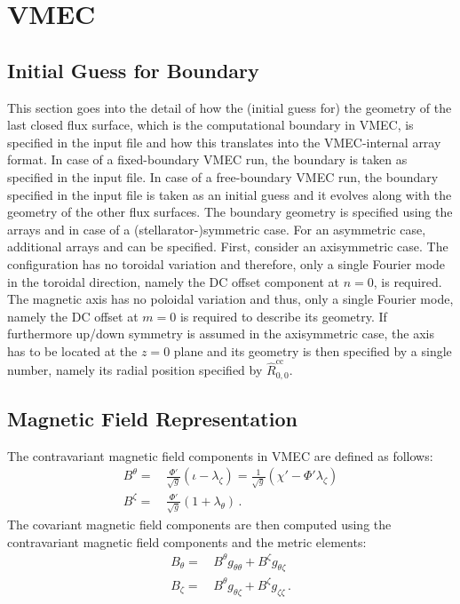 \chapter{VMEC}

\FloatBarrier
\section{Initial Guess for Boundary}
This section goes into the detail of how the (initial guess for) the geometry
of the last closed flux surface, which is the computational boundary in VMEC,
is specified in the input file and how this translates into the VMEC-internal array format.
In case of a fixed-boundary VMEC run, the boundary is taken as specified in the input file.
In case of a free-boundary VMEC run, the boundary specified in the input file
is taken as an initial guess and it evolves along with the geometry of the other flux surfaces.
The boundary geometry is specified using the arrays  and 
in case of a (stellarator-)symmetric case. For an asymmetric case,
additional arrays  and  can be specified.
First, consider an axisymmetric case. The configuration has no toroidal variation
and therefore, only a single Fourier mode in the toroidal direction,
namely the DC offset component at $n=0$, is required.
The magnetic axis has no poloidal variation and thus, only a single Fourier mode,
namely the DC offset at $m=0$ is required to describe its geometry.
If furthermore up/down symmetry is assumed in the axisymmetric case,
the axis has to be located at the $z=0$ plane and its geometry is then specified
by a single number, namely its radial position specified by $\hat{R}^\mathrm{cc}_{0,0}$.

\FloatBarrier
\section{Magnetic Field Representation}
The contravariant magnetic field components in VMEC are defined as follows:
\begin{align}
  B^\theta =&\, \frac{\Phi'}{\sqrt{g}} \left( \iota - \lambda_\zeta  \right)
           =    \frac{1}{\sqrt{g}} \left( \chi' - \Phi' \lambda_\zeta  \right) \label{eqn:bsuptheta} \\
  B^\zeta  =&\, \frac{\Phi'}{\sqrt{g}} \left(   1   + \lambda_\theta \right) \label{eqn:bsupzeta} \, .
\end{align}
The covariant magnetic field components are then computed using the contravariant magnetic field components and the metric elements:
\begin{align}
  B_\theta =&\, B^\theta g_{\theta \theta} + B^\zeta g_{\theta \zeta } \label{eqn:bsubtheta_from_contra} \\
  B_\zeta  =&\, B^\theta g_{\theta \zeta } + B^\zeta g_{\zeta  \zeta } \label{eqn:bsubzeta_from_contra}  \, .
\end{align}

